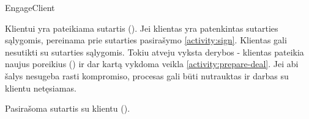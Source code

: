 \begin{processTable}{EngageClient}
{        \item Klientui yra pateikiama sutartis (). Jei klientas yra patenkintas sutarties sąlygomis, pereinama prie sutarties pasirašymo \ref{activity:sign}. Klientas gali nesutikti su sutarties sąlygomis. Tokiu atveju vyksta derybos - klientas pateikia naujus poreikius () ir  dar kartą vykdoma veikla \ref{activity:prepare-deal}. Jei abi šalys nesugeba rasti kompromiso, procesas gali būti nutrauktas ir darbas su klientu netęsiamas.

        \item Pasirašoma sutartis su klientu (). \label{activity:sign}
    }
\end{processTable}

\newpage
\subsection{} %

